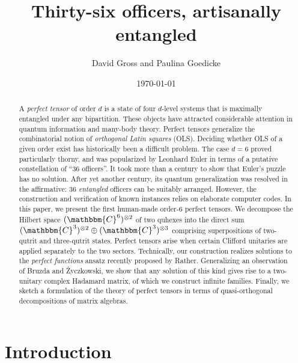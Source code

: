 \documentclass[aps,nofootinbib,floatfix,a4paper]{revtex4}
\newcommand{\1}{\mbox{$\mathbf{1}$}}
\def\CC{\mathbbm{C}}
\begin{document}
\title{Thirty-six officers, artisanally entangled}

\author{David Gross and Paulina Goedicke}



\date{\today}

\begin{abstract} 
	A \emph{perfect tensor} of order $d$ is a state of four $d$-level systems that is maximally entangled under any bipartition.
	These objects have attracted considerable attention in quantum information and many-body theory.
	Perfect tensors generalize the combinatorial notion of \emph{orthogonal Latin squares} (OLS).
	Deciding whether OLS of a given order exist has historically been a difficult problem.
	The case $d=6$ proved particularly thorny, and was popularized by 
	Leonhard Euler in terms of a putative constellation of ``36 officers''. 
	It took more than a century to show that Euler's puzzle has no solution. 
	After yet another century, its quantum generalization 
	was resolved in the affirmative: 36 \emph{entangled} officers can be suitably arranged.
	However, the construction 
	and verification 
	of known instances relies on elaborate computer codes.
	In this paper, we present the first human-made order-$6$ perfect tensors. 
	We decompose the Hilbert space $(\CC^6)^{\otimes 2}$ of two quhexes
	into the direct sum $(\CC^3)^{\otimes 2}\oplus(\CC^3)^{\otimes 3}$ comprising superpositions of two-qutrit and three-qutrit states.
	Perfect tensors arise when certain Clifford unitaries are applied separately to the two sectors.  
	Technically, our construction realizes solutions to the \emph{perfect functions} ansatz recently proposed by Rather.
	Generalizing an observation of Bruzda and \.Zyczkowski, we show that any solution of this kind gives rise to a two-unitary complex Hadamard matrix, of which we construct infinite families.
	Finally, we sketch a formulation of the theory of perfect tensors in terms of quasi-orthogonal decompositions of matrix algebras.
\end{abstract}





\maketitle

\section{Introduction}
\end{document}
